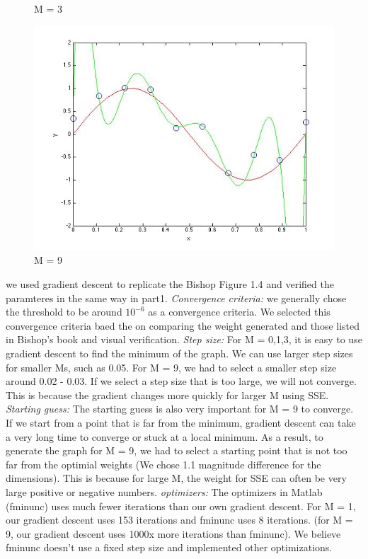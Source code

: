 \begin{figure}[!htb]
  \caption{M = 3}\label{fig:figures/p2_M=3}
\endminipage\hfill
{}                                                                            
  \includegraphics[width=\linewidth]{figures/p2_M=9}
  \caption{M = 9}\label{fig:figures/p2_M=9}
\endminipage\hfill
\end{figure}


we used gradient descent to replicate 
the Bishop Figure 1.4 and verified the paramteres in the same way in part1. 
\textit{Convergence criteria:} we generally chose the threshold to be around $10^{-6}$ as a convergence criteria. We selected this convergence criteria baed the on comparing the weight generated and those listed in Bishop's book and visual verification. 
\textit{Step size:} For M = 0,1,3, it is easy to use gradient descent to find the minimum of the graph. We can use larger step sizes for smaller Ms, such as 0.05. For M = 9, we had to select a smaller step size around 0.02 - 0.03. If we select a step size that is too large, we will not converge. This is because the gradient changes more quickly for larger M using SSE.
\textit{Starting guess:} The starting guess is also very important for M = 9 to converge. If we start from a point that is far from the minimum, gradient descent can take a very long time to converge or stuck at a local minimum. As a result, to generate the graph for M = 9, we had to select a starting point that is not too far from the optimial weights (We chose 1.1 magnitude difference for the dimensions). This is because for large M, the weight for SSE can often be very large positive or negative numbers. 
\textit{optimizers:} The optimizers in Matlab (fminunc) uses much fewer iterations than our own gradient descent. For M = 1, our gradient descent uses 153 iterations and fminunc uses 8 iterations. (for M = 9, our gradient descent uses 1000x more iterations than fminunc). We believe fminunc doesn't use a fixed step size and implemented other optimizations. 
